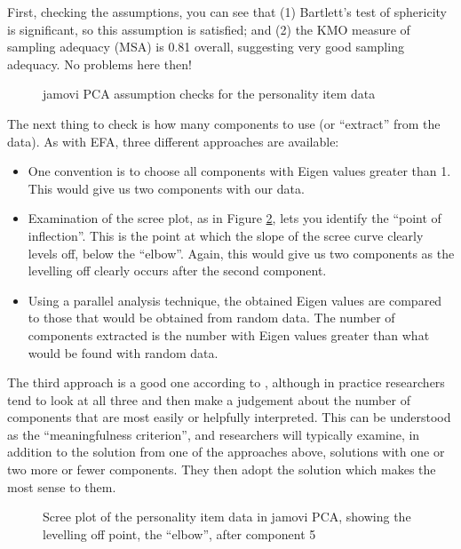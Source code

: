 First, checking the assumptions, you can see that (1) Bartlett’s test of sphericity is significant, so this assumption is satisfied; and (2) the KMO measure of sampling adequacy (MSA) is 0.81 overall, suggesting very good sampling adequacy. No problems here then! 

\begin{figure}[p]
\begin{center}
\caption{jamovi PCA assumption checks for the personality item data}
\label{fig:pca2}
\HR
\end{center}
\end{figure}

The next thing to check is how many components to use (or “extract” from the data). As with EFA, three different approaches are available:

\begin{itemize}
\item One convention is to choose all components with Eigen values greater than 1. This would give us two components with our data. 
\item Examination of the scree plot, as in Figure \ref{fig:pca3}, lets you identify the “point of inflection”. This is the point at which the slope of the scree curve clearly levels off, below the “elbow”. Again, this would give us two components as the levelling off clearly occurs after the second component. 
\item Using a parallel analysis technique, the obtained Eigen values are compared to those that would be obtained from random data. The number of components extracted is the number with Eigen values greater than what would be found with random data. 
\end{itemize}

The third approach is a good one according to \textcite{Fabrigar1999}, although in practice researchers tend to look at all three and then make a judgement about the number of components that are most easily or helpfully interpreted. This can be understood as the ``meaningfulness criterion'', and researchers will typically examine, in addition to the solution from one of the approaches above, solutions with one or two more or fewer components. They then adopt the solution which makes the most sense to them.

\begin{figure}[!htb]
\begin{center}
\caption{Scree plot of the personality item data in jamovi PCA, showing the levelling off point, the “elbow”, after component 5}
\label{fig:pca3}
\HR
\end{center}
\end{figure}

